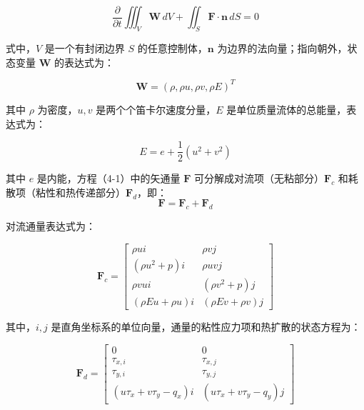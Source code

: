 \begin{equation}
\frac{\partial}{\partial t} \iiint_V \mathbf{W} \, dV + \iint_S \mathbf{F} \cdot \mathbf{n} \, dS = 0 \tag{4-1}
\end{equation}

式中，\(V\) 是一个有封闭边界 \(S\) 的任意控制体，\(\mathbf{n}\) 为边界的法向量；指向朝外，状态变量 \(\mathbf{W}\) 的表达式为：

\begin{equation}
\mathbf{W} = (\rho, \rho u, \rho v, \rho E)^T \tag{4-2}
\end{equation}

其中 \(\rho\) 为密度，\(u, v\) 是两个个笛卡尔速度分量，\(E\) 是单位质量流体的总能量，表达式为：

\begin{equation}
E = e + \frac{1}{2}(u^2 + v^2) \tag{4-3}
\end{equation}

其中 \(e\) 是内能，方程（4-1）中的矢通量 \(\mathbf{F}\) 可分解成对流项（无粘部分）\(\mathbf{F}_c\) 和耗散项（粘性和热传递部分）\(\mathbf{F}_d\)，即：
\begin{equation}
\mathbf{F} = \mathbf{F}_c + \mathbf{F}_d \tag{4-4}
\end{equation}

对流通量表达式为：

\begin{equation}
\mathbf{F}_c = 
\begin{bmatrix}
\rho u i & \rho v j \\
(\rho u^2 + p) i & \rho u v j \\
\rho v u i & (\rho v^2 + p) j \\
(\rho E u + \rho u) i & (\rho E v + \rho v) j
\end{bmatrix} \tag{4-5}
\end{equation}

其中，\(i, j\) 是直角坐标系的单位向量，通量的粘性应力项和热扩散的状态方程为：

\begin{equation}
\mathbf{F}_d = 
\begin{bmatrix}
0 & 0 \\
\tau_{x,i} & \tau_{x,j} \\
\tau_{y,i} & \tau_{y,j} \\
(u \tau_x + v \tau_y - q_x) i & (u \tau_x + v \tau_y - q_y) j
\end{bmatrix} \tag{4-6}
\end{equation}

